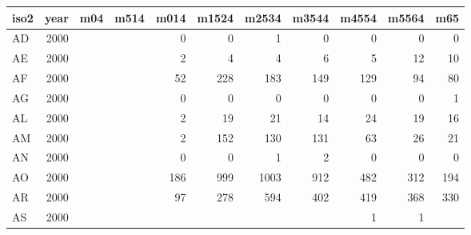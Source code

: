 \begin{tabular}{lrrrrrrrrrr}
  \toprule
 iso2 & year & m04 & m514 & m014 & m1524 & m2534 & m3544 & m4554 & m5564 & m65 \\ 
  \midrule
  AD & 2000 &  &  &   0 &   0 &   1 &   0 &   0 &   0 &   0 \\ 
  AE & 2000 &  &  &   2 &   4 &   4 &   6 &   5 &  12 &  10 \\ 
  AF & 2000 &  &  &  52 & 228 & 183 & 149 & 129 &  94 &  80 \\ 
  AG & 2000 &  &  &   0 &   0 &   0 &   0 &   0 &   0 &   1 \\ 
  AL & 2000 &  &  &   2 &  19 &  21 &  14 &  24 &  19 &  16 \\ 
  AM & 2000 &  &  &   2 & 152 & 130 & 131 &  63 &  26 &  21 \\ 
  AN & 2000 &  &  &   0 &   0 &   1 &   2 &   0 &   0 &   0 \\ 
  AO & 2000 &  &  & 186 & 999 & 1003 & 912 & 482 & 312 & 194 \\ 
  AR & 2000 &  &  &  97 & 278 & 594 & 402 & 419 & 368 & 330 \\ 
  AS & 2000 &  &  &  &  &  &  &   1 &   1 &  \\ 
   \bottomrule
\end{tabular}
